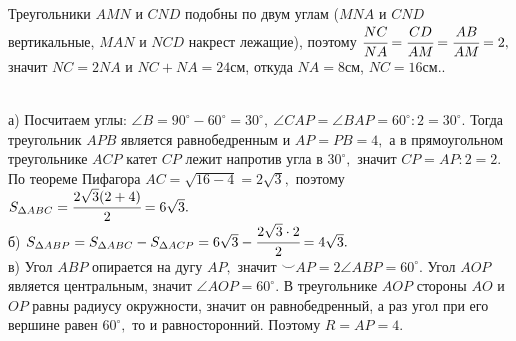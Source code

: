 \documentclass[12pt]{article}
\begin{document}
Треугольники $AMN$ и $CND$ подобны по двум углам ($MNA$ и $CND$ вертикальные, $MAN$ и $NCD$ накрест лежащие), поэтому $\cfrac{NC}{NA}=\cfrac{CD}{AM}=\cfrac{AB}{AM}=2,$ значит $NC=2NA$ и $NC+NA=24$см, откуда $NA=8$см, $NC=16$см.\newpage{}. \begin{figure}[ht!]
\end{figure}\\
а) Посчитаем углы: $\angle B=90^\circ-60^\circ=30^\circ,\ \angle CAP=\angle BAP=60^\circ:2=30^\circ.$ Тогда треугольник $APB$ является равнобедренным и $AP=PB=4,$ а в прямоугольном треугольнике $ACP$ катет $CP$ лежит напротив угла в $30^\circ,$ значит $CP=AP:2=2.$ По теореме Пифагора $AC=\sqrt{16-4}=2\sqrt{3},$ поэтому $S_{\Delta ABC}=\cfrac{2\sqrt{3}(2+4)}{2}=6\sqrt{3}.$\\
б) $S_{\Delta ABP}=S_{\Delta ABC}-S_{\Delta ACP}=6\sqrt{3}-\cfrac{2\sqrt{3}\cdot2}{2}=4\sqrt{3}.$\\
в) Угол $ABP$ опирается на дугу $AP,$ значит $\smile AP=2\angle ABP=60^\circ.$ Угол $AOP$ является центральным, значит $\angle AOP=60^\circ.$ В треугольнике $AOP$ стороны $AO$ и $OP$ равны радиусу окружности, значит он равнобедренный, а раз угол при его вершине равен $60^\circ,$ то и равносторонний. Поэтому $R=AP=4.$\\
\end{document}

